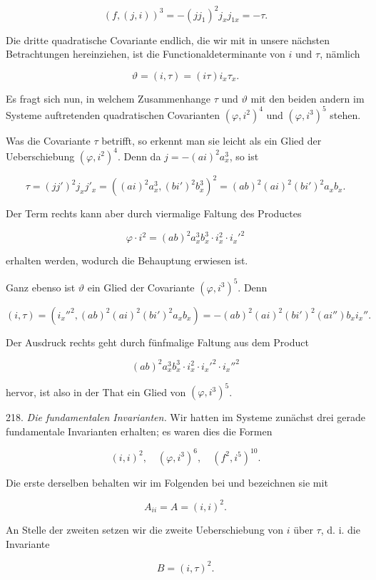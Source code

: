 \documentclass[11pt]{article}
\begin{document}
\[ (f, (j, i))^3 = -(j j_1)^2 j_x j_{1x} = -\tau. \]

Die dritte quadratische Covariante endlich, die wir mit in unsere
nächsten Betrachtungen hereinziehen, ist die Functionaldeterminante
von $i$ und $\tau$, nämlich

\[ \vartheta = (i, \tau) = (i \tau) i_x \tau_x. \]

Es fragt sich nun, in welchem Zusammenhange $\tau$ und $\vartheta$ mit den
beiden andern im Systeme auftretenden quadratischen Covarianten
$(\varphi, i^2)^4$ und $(\varphi, i^3)^5$ stehen.

Was die Covariante $\tau$ betrifft, so erkennt man sie leicht als ein
Glied der Ueberschiebung $(\varphi, i^2)^4$. Denn da $j = -(ai)^2 a_x^3$, so ist

\[ \tau = (j j')^2 j_x j'_x = ((ai)^2 a_x^3, (bi')^2 b_x^3)^2 = (ab)^2 (ai)^2 (bi')^2 a_x b_x. \]

Der Term rechts kann aber durch viermalige Faltung des Productes

\[ \varphi \cdot i^2 = (ab)^2 a_x^3 b_x^3 \cdot i_x^2 \cdot i_x'^2 \]

erhalten werden, wodurch die Behauptung erwiesen ist.

Ganz ebenso ist $\vartheta$ ein Glied der Covariante $(\varphi, i^3)^5$. Denn

\[ (i, \tau) = (i_x''^2, (ab)^2 (ai)^2 (bi')^2 a_x b_x) = -(ab)^2 (ai)^2 (bi')^2 (ai'') b_x i_x''. \]

Der Ausdruck rechts geht durch fünfmalige Faltung aus dem Product

\[ (ab)^2 a_x^3 b_x^3 \cdot i_x^2 \cdot i_x'^2 \cdot i_x''^2 \]

hervor, ist also in der That ein Glied von $(\varphi, i^3)^5$.

218. \textit{Die fundamentalen Invarianten.} Wir hatten im Systeme zunächst
 drei gerade fundamentale Invarianten erhalten; es waren dies
die Formen

\[ (i, i)^2, \quad (\varphi, i^3)^6, \quad (f^2, i^5)^{10}. \]

Die erste derselben behalten wir im Folgenden bei und bezeichnen
sie mit

\[ A_{ii} = A = (i, i)^2. \]

An Stelle der zweiten setzen wir die zweite Ueberschiebung von $i$
über $\tau$, d. i. die Invariante

\[ B = (i, \tau)^2. \]
\end{document}
